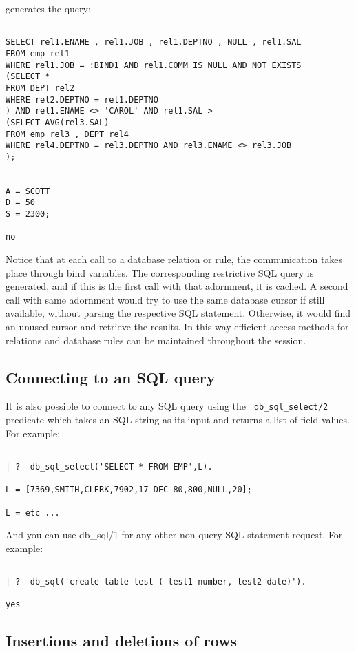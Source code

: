 generates the query:
\begin{verbatim}

SELECT rel1.ENAME , rel1.JOB , rel1.DEPTNO , NULL , rel1.SAL
FROM emp rel1
WHERE rel1.JOB = :BIND1 AND rel1.COMM IS NULL AND NOT EXISTS
(SELECT *
FROM DEPT rel2
WHERE rel2.DEPTNO = rel1.DEPTNO
) AND rel1.ENAME <> 'CAROL' AND rel1.SAL > 
(SELECT AVG(rel3.SAL)
FROM emp rel3 , DEPT rel4
WHERE rel4.DEPTNO = rel3.DEPTNO AND rel3.ENAME <> rel3.JOB
);


A = SCOTT
D = 50
S = 2300;

no
\end{verbatim}

Notice that at each call to a database relation or rule, the
communication takes place through bind variables.  The corresponding
restrictive SQL query is generated, and if this is the first call with
that adornment, it is cached.  A second call with same adornment would
try to use the same database cursor if still available, without
parsing the respective SQL statement.  Otherwise, it would find an
unused cursor and retrieve the results.  In this way efficient access
methods for relations and database rules can be maintained throughout
the session.

\subsection{ Connecting to an SQL query}


It is also possible to connect to any SQL query using the {\tt
db\_sql\_select/2} predicate which takes an SQL string as its input and
returns a list of field values.  For example:
\begin{verbatim}

| ?- db_sql_select('SELECT * FROM EMP',L).

L = [7369,SMITH,CLERK,7902,17-DEC-80,800,NULL,20];

L = etc ...
\end{verbatim}

And you can use db\_sql/1 for any other non-query SQL statement request.  For 
example:
\begin{verbatim}

| ?- db_sql('create table test ( test1 number, test2 date)').

yes
\end{verbatim}

\subsection{Insertions and deletions of rows}

